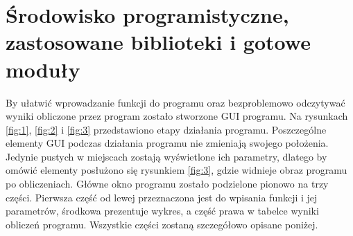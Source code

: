 \documentclass[10pt, a4paper]{article}
\begin{document}
\section{Środowisko programistyczne, zastosowane biblioteki i gotowe moduły}
\label{subsec:gui}
By ułatwić wprowadzanie funkcji do programu oraz bezproblemowo odczytywać wyniki obliczone przez program zostało stworzone GUI programu. Na rysunkach \ref{fig:1}, \ref{fig:2} i \ref{fig:3} przedstawiono etapy działania programu. Poszczególne elementy GUI podczas działania programu nie zmieniają swojego położenia. Jedynie pustych w miejscach zostają wyświetlone ich parametry, dlatego by omówić elementy posłużono się rysunkiem \ref{fig:3}, gdzie widnieje obraz programu po obliczeniach. Główne okno programu zostało podzielone pionowo na trzy części. Pierwsza część od lewej przeznaczona jest do wpisania funkcji i jej parametrów, środkowa prezentuje wykres, a część prawa w tabelce wyniki obliczeń programu. Wszystkie części zostaną szczegółowo opisane poniżej.
\end{document}
